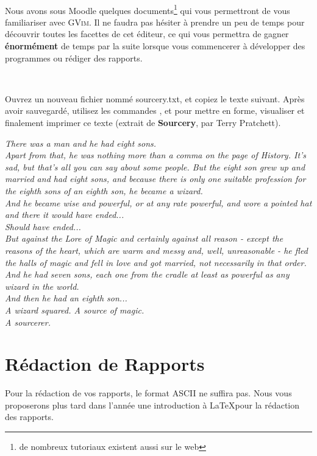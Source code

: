 \documentclass[a4paper,10pt]{article}
\begin{document}
\

Nous avons sous Moodle quelques documents\footnote{de nombreux tutoriaux
existent aussi sur le web} qui vous permettront de vous
familiariser avec \textsc{GVim}.
Il ne faudra pas hésiter à prendre un peu de temps
pour découvrir toutes les facettes de cet éditeur, ce qui vous permettra de
gagner \textbf{énormément} de temps par la suite lorsque vous commencerer à
développer des programmes ou rédiger des rapports.

\

\begin{maw}
Ouvrez un nouveau fichier nommé sourcery.txt, et copiez le texte suivant. Après
avoir sauvegardé, utilisez les commandes
,  et  pour mettre en forme, visualiser et
finalement imprimer ce texte (extrait de \textbf{Sourcery}, par Terry
Pratchett).
\end{maw}

\emph{There was a man and he had eight sons.\\
Apart from that, he was nothing more than a comma on the page of History.
It's sad, but that's all you can say about some people. But the eight son
grew up and married and had eight sons, and because there is only one suitable
profession for the eighth sons of an eighth son, he became a wizard.\\ And he
became wise and powerful, or at any rate powerful, and wore a pointed hat and
there it would have ended...\\
Should have ended...\\
But against the Lore of Magic and certainly against all reason - except the
reasons of the heart, which are warm and messy and, well, unreasonable - he
fled the halls of magic and fell in love and got married, not necessarily in
that order.\\
And he had seven sons, each one from the cradle at least as powerful as any
wizard in the world.\\
And then he had an eighth son...\\
A wizard squared.  A source of magic.\\
A sourcerer.
}


\section{Rédaction de Rapports}

Pour la rédaction de vos rapports, le format ASCII ne suffira pas. Nous vous
proposerons plus tard dans l'année une introduction à \LaTeX pour la rédaction
des rapports.
\end{document}
